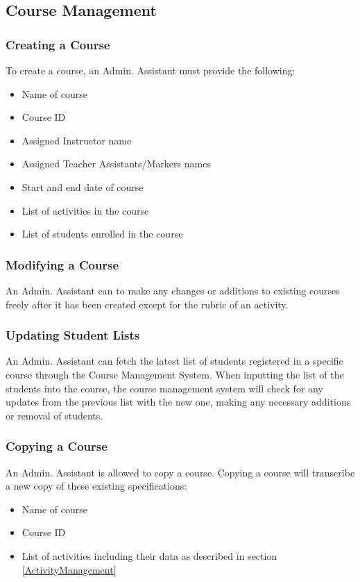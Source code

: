 \documentclass{article}
\begin{document}
\subsection {Course Management}
\subsubsection{Creating a Course \label{courseCreation}}
To create a course, an Admin. Assistant must provide the following:
\begin{itemize}
	\item Name of course
	\item Course ID
	\item Assigned Instructor name
	\item Assigned Teacher Assistants/Markers names
	\item Start and end date of course
	\item List of activities in the course
	\item List of students enrolled in the course
\end{itemize}
\subsubsection{Modifying a Course\label{modifying}}
An Admin. Assistant can to make any changes or additions to existing courses
freely after it has been created except for the rubric of an activity.
\subsubsection{Updating Student Lists}
An Admin. Assistant can fetch the latest list of students registered in a
specific course through the Course Management System.
When inputting the list of the students into the course, the course management
system will check for any updates from the previous list with the new one,
making any necessary additions or removal of students.
\subsubsection{Copying a Course}
An Admin. Assistant is allowed to copy a course. Copying a course will transcribe
a new copy of these existing specifications:
\begin{itemize}
  \item Name of course
  \item Course ID
  \item List of activities including their data as described in section
    \ref{ActivityManagement}
\end {itemize}
\end{document}
